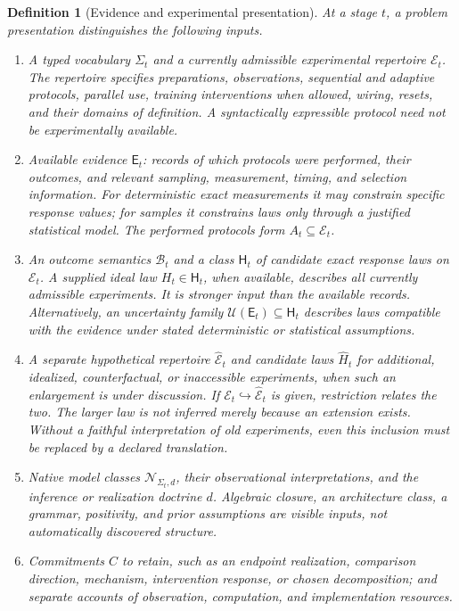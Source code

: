 \documentclass[11pt]{article}
\newtheorem{definition}{Definition}[section]
\theoremstyle{remark}
\newcommand{\calE}{\mathcal E}
\newcommand{\calN}{\mathcal N}
\newcommand{\calB}{\mathcal B}
\newcommand{\calU}{\mathcal U}
\begin{document}
\begin{definition}[Evidence and experimental presentation]
At a stage $t$, a problem presentation distinguishes the following inputs.
\begin{enumerate}
\item A typed vocabulary $\Sigma_t$ and a \emph{currently admissible experimental repertoire} $\calE_t$. The repertoire specifies preparations, observations, sequential and adaptive protocols, parallel use, training interventions when allowed, wiring, resets, and their domains of definition. A syntactically expressible protocol need not be experimentally available.
\item \emph{Available evidence} $\mathsf E_t$: records of which protocols were performed, their outcomes, and relevant sampling, measurement, timing, and selection information. For deterministic exact measurements it may constrain specific response values; for samples it constrains laws only through a justified statistical model. The performed protocols form $A_t\subseteq\calE_t$.
\item An outcome semantics $\calB_t$ and a class $\mathsf H_t$ of candidate exact response laws on $\calE_t$. A supplied ideal law $H_t\in\mathsf H_t$, when available, describes all currently admissible experiments. It is stronger input than the available records. Alternatively, an uncertainty family $\calU(\mathsf E_t)\subseteq\mathsf H_t$ describes laws compatible with the evidence under stated deterministic or statistical assumptions.
\item A separate hypothetical repertoire $\widehat{\calE}_t$ and candidate laws $\widehat H_t$ for additional, idealized, counterfactual, or inaccessible experiments, when such an enlargement is under discussion. If $\calE_t\hookrightarrow\widehat{\calE}_t$ is given, restriction relates the two. The larger law is not inferred merely because an extension exists. Without a faithful interpretation of old experiments, even this inclusion must be replaced by a declared translation.
\item Native model classes $\calN_{\Sigma_t,d}$, their observational interpretations, and the inference or realization doctrine $d$. Algebraic closure, an architecture class, a grammar, positivity, and prior assumptions are visible inputs, not automatically discovered structure.
\item Commitments $C$ to retain, such as an endpoint realization, comparison direction, mechanism, intervention response, or chosen decomposition; and separate accounts of observation, computation, and implementation resources.
\end{enumerate}
\end{definition}
\end{document}
